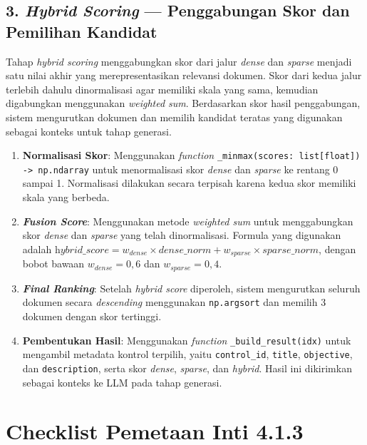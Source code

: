\documentclass[12pt,a4paper]{article}
\begin{document}
\subsection*{3. \textit{Hybrid Scoring} --- Penggabungan Skor dan Pemilihan Kandidat}

Tahap \textit{hybrid scoring} menggabungkan skor dari jalur \textit{dense} dan \textit{sparse} menjadi satu nilai akhir yang merepresentasikan relevansi dokumen. Skor dari kedua jalur terlebih dahulu dinormalisasi agar memiliki skala yang sama, kemudian digabungkan menggunakan \textit{weighted sum}. Berdasarkan skor hasil penggabungan, sistem mengurutkan dokumen dan memilih kandidat teratas yang digunakan sebagai konteks untuk tahap generasi.

\begin{enumerate}[label=\alph*., leftmargin=1.1cm]
\item \textbf{Normalisasi Skor}: Menggunakan \textit{function} \texttt{\_minmax(scores: list[float]) -> np.ndarray} untuk menormalisasi skor \textit{dense} dan \textit{sparse} ke rentang 0 sampai 1. Normalisasi dilakukan secara terpisah karena kedua skor memiliki skala yang berbeda.

\item \textbf{\textit{Fusion Score}}: Menggunakan metode \textit{weighted sum} untuk menggabungkan skor \textit{dense} dan \textit{sparse} yang telah dinormalisasi. Formula yang digunakan adalah $\textit{hybrid\_score} = w_{\textit{dense}} \times \textit{dense\_norm} + w_{\textit{sparse}} \times \textit{sparse\_norm}$, dengan bobot bawaan $w_{\textit{dense}} = 0{,}6$ dan $w_{\textit{sparse}} = 0{,}4$.

\item \textbf{\textit{Final Ranking}}: Setelah \textit{hybrid score} diperoleh, sistem mengurutkan seluruh dokumen secara \textit{descending} menggunakan \texttt{np.argsort} dan memilih 3 dokumen dengan skor tertinggi.

\item \textbf{Pembentukan Hasil}: Menggunakan \textit{function} \texttt{\_build\_result(idx)} untuk mengambil metadata kontrol terpilih, yaitu \texttt{control\_id}, \texttt{title}, \texttt{objective}, dan \texttt{description}, serta skor \textit{dense}, \textit{sparse}, dan \textit{hybrid}. Hasil ini dikirimkan sebagai konteks ke LLM pada tahap generasi.
\end{enumerate}

\section*{Checklist Pemetaan Inti 4.1.3}
\end{document}
